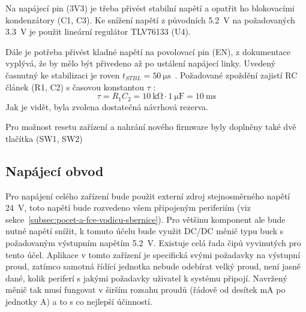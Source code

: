             Na napájecí pin (3V3) je třeba přivést stabilní napětí a opatřit ho blokovacími kondenzátory (C1, C3). Ke snížení napětí z původních \qty{5,2}{V} na požadovaných \qty{3,3}{V} je použit lineární regulátor TLV76133 (U4). 
            
            Dále je potřeba přivést kladné napětí na povolovací pin (EN), z dokumentace vyplývá, že by mělo být přivedeno až po ustálení napájecí linky. Uvedený časnutný ke stabilizaci je roven \(t_{STBL}=\qty{50}{\micro\second}\)~\cite{esp32-datasheet}. Požadované zpoždění zajistí RC článek (R1, C2) s časovou konstantou \(\tau\) :
            \begin{equation}
                \tau=R_{1}C_{2}=\qty{10}{\kilo\ohm}\cdot \qty{1}{\micro\farad}=\qty{10}{\milli\second}
            \end{equation} 
            Jak je vidět, byla zvolena dostatečná návrhová rezerva. 

            Pro možnost resetu zařízení a nahrání nového firmware byly doplněny také dvě tlačítka (SW1, SW2)


    \clearpage
    \subsection{Napájecí obvod}
        Pro napájení celého zařízení bude použit externí zdroj stejnosměrného napětí \qty{24}{V}, toto napětí bude rozvedeno všem připojeným periferiím (viz sekce~\ref{subsec:pocet-a-fce-vodicu-sbernice}). Pro většinu komponent ale bude nutné napětí snížit, k tomuto účelu bude využit DC/DC měnič typu buck s požadovaným výstupním napětím \qty{5.2}{V}. Existuje celá řada čipů vyvinutých pro tento účel. Aplikace v tomto zařízení je specifická svými požadavky na výstupní proud, zatímco samotná řídící jednotka nebude odebírat velký proud, není jasně dané, kolik periferí s jakými požadavky uživatel k systému připojí. Navržený měnič tak musí fungovat v širším rozsahu proudů (řádově od desítek mA po jednotky A) a to s co nejlepší účinností. 
        
